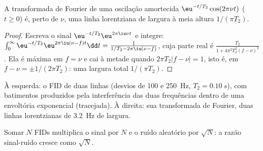 \begin{theorem}\label{thm:b3:advanced-nmr:lorentzian}
A transformada de Fourier de uma oscilação amortecida $\eu^{-t/T_2}\cos(2\pi\nu t)$ ($t \ge 0$) é,
perto de $\nu$, uma linha lorentziana de largura à meia altura $1/(\pi T_2)$.
\end{theorem}

\begin{proof}
Escreva o sinal $\eu^{-t/T_2}\eu^{2\pi\iu\nu t}$ e integre:
$\int_0^\infty\eu^{-t/T_2}\eu^{2\pi\iu(\nu - f)t}\dd t = \frac{1}{1/T_2 - 2\pi\iu(\nu - f)}$, cuja parte
real é $\frac{T_2}{1 + 4\pi^2T_2^2(f - \nu)^2}$. Ela é máxima em $f = \nu$ e cai à
metade quando $2\pi T_2|f - \nu| = 1$, isto é, em $f - \nu = \pm1/(2\pi T_2)$: uma largura
total $1/(\pi T_2)$.
\end{proof}

\begin{omfigure}

{\small À esquerda: o FID de duas linhas (desvios de 100 e \qty{250}{Hz}, $T_2 = \qty{0.10}{s}$),
com batimentos produzidos pela interferência das duas frequências dentro de
uma envoltória exponencial (tracejada). À direita: sua transformada de Fourier,
duas linhas lorentzianas de \qty{3.2}{Hz} de largura.}
\end{omfigure}

\begin{proposition}\label{prop:b3:advanced-nmr:averaging}
Somar $N$ FIDs multiplica o sinal por $N$ e o ruído aleatório por $\sqrt N$:
a razão sinal-ruído cresce como $\sqrt N$.
\end{proposition}

